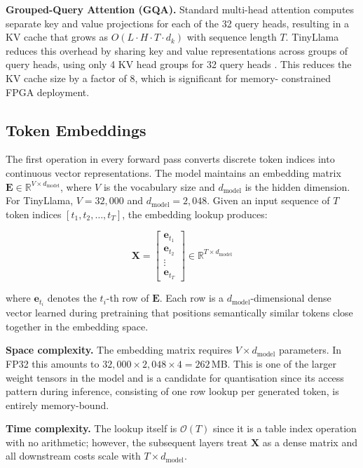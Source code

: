 \noindent\textbf{Grouped-Query Attention (GQA).} Standard multi-head
attention computes separate key and value projections for each of the 32
query heads, resulting in a KV cache that grows as $O(L \cdot H \cdot T
\cdot d_k)$ with sequence length $T$. TinyLlama reduces this overhead by
sharing key and value representations across groups of query heads, using
only 4 KV head groups for 32 query heads \cite{ainslie2023gqa}. This reduces
the KV cache size by a factor of 8, which is significant for memory-
constrained FPGA deployment.

\subsection{Token Embeddings}
\label{subsec:embeddings}

The first operation in every forward pass converts discrete token indices
into continuous vector representations. The model maintains an embedding
matrix $\mathbf{E} \in \mathbb{R}^{V \times d_{\text{model}}}$, where $V$
is the vocabulary size and $d_{\text{model}}$ is the hidden dimension. For
TinyLlama, $V = 32{,}000$ and $d_{\text{model}} = 2{,}048$. Given an input
sequence of $T$ token indices $[t_1, t_2, \ldots, t_T]$, the embedding
lookup produces:

\begin{equation}
  \mathbf{X} = \begin{bmatrix}
    \mathbf{e}_{t_1} \\
    \mathbf{e}_{t_2} \\
    \vdots \\
    \mathbf{e}_{t_T}
  \end{bmatrix} \in \mathbb{R}^{T \times d_{\text{model}}}
  \label{eq:embedding}
\end{equation}

\noindent where $\mathbf{e}_{t_i}$ denotes the $t_i$-th row of
$\mathbf{E}$. Each row is a $d_{\text{model}}$-dimensional dense vector
learned during pretraining that positions semantically similar tokens close
together in the embedding space.

\noindent\textbf{Space complexity.} The embedding matrix requires
$V \times d_{\text{model}}$ parameters. In FP32 this amounts to
$32{,}000 \times 2{,}048 \times 4 = 262$\,MB. This is one of the larger
weight tensors in the model and is a candidate for quantisation since its
access pattern during inference, consisting of one row lookup per generated
token, is entirely memory-bound.

\noindent\textbf{Time complexity.} The lookup itself is $\mathcal{O}(T)$
since it is a table index operation with no arithmetic; however, the
subsequent layers treat $\mathbf{X}$ as a dense matrix and all downstream
costs scale with $T \times d_{\text{model}}$.


